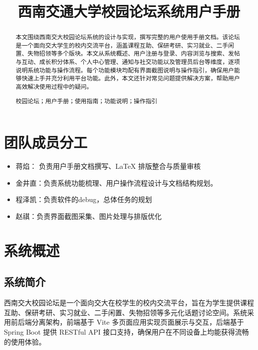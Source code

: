 \documentclass[bwprint]{report}
\title{西南交通大学校园论坛系统用户手册}
\begin{document}
\maketitle
\newpage

\pagestyle{plain}
\begin{abstract}

本文围绕西南交大校园论坛系统的设计与实现，撰写完整的用户使用手册文档。该论坛是一个面向交大学生的校内交流平台，涵盖课程互助、保研考研、实习就业、二手闲置、失物招领等多个版块。本文从系统概述、用户注册与登录、内容浏览与搜索、发帖与互动、成长积分体系、个人中心管理、通知与社交功能以及管理员后台等维度，逐项说明系统功能与操作流程。每个功能模块均配有界面截图说明与操作指引，确保用户能够快速上手并充分利用平台功能。此外，本文还针对常见问题提供解决方案，帮助用户高效解决使用过程中的疑问。

\vspace{0.5em}
校园论坛；用户手册；使用指南；功能说明；操作指引
\end{abstract}

\tableofcontents
\newpage
\pagestyle{plain}

\setcounter{page}{1}

\section{团队成员分工}
\begin{itemize}[leftmargin=2em]
	\item 蒋焰：  负责用户手册文档撰写、\LaTeX{} 排版整合与质量审核
    \item 金井直：负责系统功能梳理、用户操作流程设计与文档结构规划。
    \item 程泽凯：负责软件的debug，总体任务的规划
    \item 赵祺：负责界面截图采集、图片处理与排版优化
\end{itemize}

\section{系统概述}

\subsection{系统简介}
西南交大校园论坛是一个面向交大在校学生的校内交流平台，旨在为学生提供课程互助、保研考研、实习就业、二手闲置、失物招领等多元化话题讨论空间。系统采用前后端分离架构，前端基于 Vite 多页面应用实现页面展示与交互，后端基于 Spring Boot 提供 RESTful API 接口支持，确保用户在不同设备上均能获得流畅的使用体验。
\end{document}
